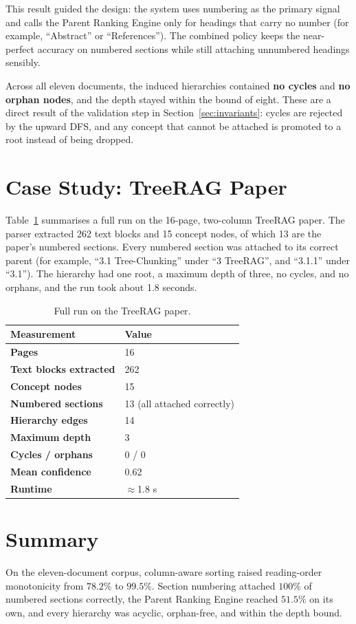 \documentclass[12pt,a4paper,twoside,openright]{report}
\begin{document}
This result guided the design: the system uses numbering as the primary signal and calls
the Parent Ranking Engine only for headings that carry no number (for example,
``Abstract'' or ``References''). The combined policy keeps the near-perfect accuracy on
numbered sections while still attaching unnumbered headings sensibly.

Across all eleven documents, the induced hierarchies contained \textbf{no cycles} and
\textbf{no orphan nodes}, and the depth stayed within the bound of eight. These are a
direct result of the validation step in Section~\ref{sec:invariants}: cycles are
rejected by the upward DFS, and any concept that cannot be attached is promoted to a
root instead of being dropped.

\section{Case Study: TreeRAG Paper}
Table~\ref{tab:case} summarises a full run on the 16-page, two-column TreeRAG paper. The
parser extracted 262 text blocks and 15 concept nodes, of which 13 are the paper's
numbered sections. Every numbered section was attached to its correct parent (for
example, ``3.1 Tree-Chunking'' under ``3 TreeRAG'', and ``3.1.1'' under ``3.1''). The
hierarchy had one root, a maximum depth of three, no cycles, and no orphans, and the run
took about 1.8 seconds.

\begin{table}[!htbp]
\centering
\caption{Full run on the TreeRAG paper.}
\label{tab:case}
\renewcommand{\arraystretch}{1.25}
{\small
\begin{tabularx}{\textwidth}{@{} >{\bfseries}l X @{}}
\toprule
Measurement & Value \\ \midrule
Pages & 16 \\
Text blocks extracted & 262 \\
Concept nodes & 15 \\
Numbered sections & 13 (all attached correctly) \\
Hierarchy edges & 14 \\
Maximum depth & 3 \\
Cycles / orphans & 0 / 0 \\
Mean confidence & 0.62 \\
Runtime & $\approx$1.8 s \\ \bottomrule
\end{tabularx}}
\end{table}

\section{Summary}
On the eleven-document corpus, column-aware sorting raised reading-order monotonicity
from $78.2\%$ to $99.5\%$. Section numbering attached $100\%$ of numbered sections
correctly, the Parent Ranking Engine reached $51.5\%$ on its own, and every hierarchy
was acyclic, orphan-free, and within the depth bound.
\end{document}
